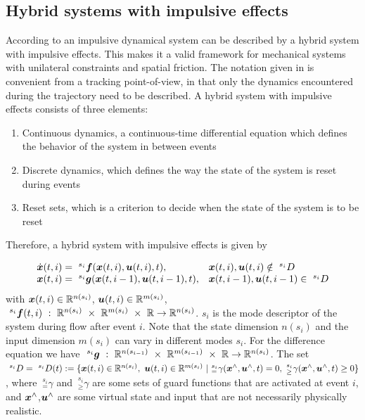 \documentclass[../DC2017114Bouma.tex]{subfiles}
\begin{document}
\subsection{Hybrid systems with impulsive effects}
According to \cite{Haddad2006} an impulsive dynamical system can be described by a hybrid system with impulsive effects. This makes it a valid framework for mechanical systems with unilateral constraints and spatial friction. The notation given in \cite{Haddad2006} is convenient from a tracking point-of-view, in that only the dynamics encountered during the trajectory need to be described. A hybrid system with impulsive effects consists of three elements:
\begin{enumerate}
\item Continuous dynamics, a continuous-time differential equation which defines the behavior of the system in between events
\item Discrete dynamics, which defines the way the state of the system is reset during events
\item Reset sets, which is a criterion to decide when the state of the system is to be reset
\end{enumerate}

Therefore, a hybrid system with impulsive effects is given by

\begin{equation}
\begin{array}{ll}
\dot{{\boldsymbol{x}}}(t,i) =\ ^{s_i}{\boldsymbol{f}}({\boldsymbol{x}}(t,i),{\boldsymbol{u}}(t,i),t),& {\boldsymbol{x}}(t,i),{\boldsymbol{u}}(t,i)\notin \ ^{s_i}D\\
{\boldsymbol{x}}(t,i) = \ ^{s_i}{\boldsymbol{g}}({\boldsymbol{x}}(t,i-1),{\boldsymbol{u}}(t,i-1),t),& {\boldsymbol{x}}(t,i-1),{\boldsymbol{u}}(t,i-1)\in \ ^{s_i}D
\end{array}\label{eq:hybimp}
\end{equation}
with ${\boldsymbol{x}}(t,i)\in\mathbb{R}^{n(s_i)}$, ${\boldsymbol{u}}(t,i)\in\mathbb{R}^{m(s_i)}$, $\ ^{s_i}\fb(t,i)\ :\ \Rbb^{n(s_i)}\ \times\ \Rbb^{m(s_i)}\ \times\ \Rbb\rightarrow \Rbb^{n(s_i)}$. $s_i$ is the mode descriptor of the system during flow after event $i$. Note that the state dimension $n(s_i)$ and the input dimension $m(s_i)$ can vary in different modes $s_i$. For the difference equation we have $\ ^{s_i}\gb\ :\ \Rbb^{n(s_{i-1})}\ \times\ \Rbb^{m(s_{i-1})}\ \times\ \Rbb\rightarrow \Rbb^{n(s_i)}$. The set $\ ^{s_i}D = \ ^{s_i}D(t) := \{\xb(t,i)\in\Rbb^{n(s_i)},\ \ub(t,i)\in\Rbb^{m(s_i)}\ |\ ^{s_i}_{=}\gamma(\xb^{\wedge},\ub^{\wedge},t) = 0, \ ^{s_i}_{\geq}\gamma(\xb^{\wedge},\ub^{\wedge},t) \geq 0\}$, where $\ ^{s_i}_{=}\gamma$ and $\ ^{s_i}_{\geq}\gamma$ are some sets of guard functions that are activated at event $i$, and ${\boldsymbol{x}}^{\wedge}$,${\boldsymbol{u}}^{\wedge}$ are some virtual state and input that are not necessarily physically realistic.
\end{document}
